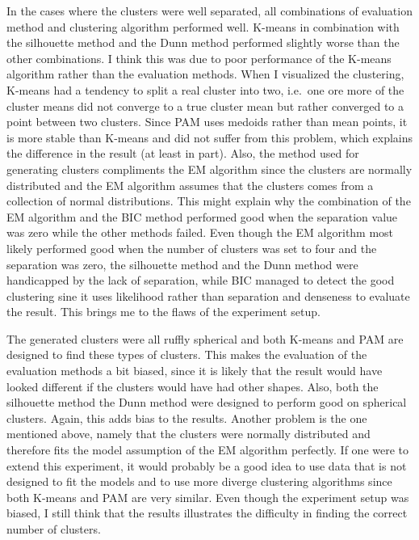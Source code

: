 \documentclass[11pt,twoside,swedish]{article}
\begin{document}
In the cases where the clusters were well separated, all combinations
of evaluation method and clustering algorithm performed
well. K-means in combination with the silhouette method and the Dunn
method performed slightly worse than the other combinations. I think
this was due to poor performance of the K-means algorithm rather than
the evaluation methods. When I visualized the clustering, K-means had
a tendency to split a real cluster into two, i.e.\ one ore more of
the cluster means did not converge to a true cluster mean but rather
converged to a point between two clusters. Since PAM uses medoids
rather than mean points, it is more stable than K-means and did not
suffer from this problem, which explains the difference in the result
(at least in part). Also, the method used for generating clusters
compliments the EM algorithm since the clusters are normally
distributed and the EM algorithm assumes that the clusters comes from
a collection of normal distributions. This might explain why the combination
of the EM algorithm and the BIC method performed good when the
separation value was zero while the other methods failed. Even though
the EM algorithm most likely performed good when the number of
clusters was set to four and the separation was zero, the silhouette
method and the Dunn method were handicapped by the lack of separation,
while BIC managed to detect the good clustering sine it uses
likelihood rather than separation and denseness to evaluate the
result. This brings me to the flaws of the experiment setup.

The generated clusters were all ruffly spherical and both K-means and PAM are
designed to find these types of clusters. This makes the evaluation of
the evaluation methods a bit biased, since it is likely that the
result would have looked different if the clusters would have had
other shapes. Also, both the silhouette method the Dunn method were
designed to perform good on spherical clusters. Again, this adds bias
to the results. Another problem is the one mentioned above, namely
that the clusters were normally distributed and therefore fits the
model assumption of the EM algorithm perfectly. If one were to extend
this experiment, it would probably be a good idea to use data that is
not designed to fit the models and to use more diverge clustering
algorithms since both K-means and PAM are very similar. Even though
the experiment setup was biased, I still think that the  results
illustrates the difficulty in finding the correct number of clusters.

\newpage
\end{document}
